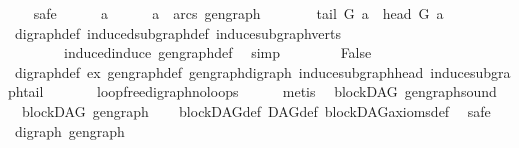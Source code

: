 \begin{isabellebody}
\ \ \isamarkupfalse%
\ safe\isanewline
\ \ \ \ \isamarkupfalse%
\ a\isanewline
\ \ \ \ \isamarkupfalse%
\ {\isachardoublequoteopen}a\ {\isasymin}\ arcs\ gen{\isacharunderscore}{\kern0pt}graph{\isachardoublequoteclose}\isanewline
\ \ \ \ \isamarkupfalse%
\ \isamarkupfalse%
\ {\isachardoublequoteopen}tail\ G\ a\ {\isacharequal}{\kern0pt}\ head\ G\ a{\isachardoublequoteclose}\isanewline
\ \ \ \ \ \ \isamarkupfalse%
\ digraph{\isacharunderscore}{\kern0pt}def\ induced{\isacharunderscore}{\kern0pt}subgraph{\isacharunderscore}{\kern0pt}def\ induce{\isacharunderscore}{\kern0pt}subgraph{\isacharunderscore}{\kern0pt}verts\isanewline
\ \ \ \ \ \ \ \ induced{\isacharunderscore}{\kern0pt}induce\ gen{\isacharunderscore}{\kern0pt}graph{\isacharunderscore}{\kern0pt}def\ \isamarkupfalse%
\ simp\isanewline
\ \ \isamarkupfalse%
\isanewline
\ \ \isamarkupfalse%
\ \isamarkupfalse%
\ False\isanewline
\ \ \ \ \isamarkupfalse%
\ digraph{\isacharunderscore}{\kern0pt}def\ ex\ gen{\isacharunderscore}{\kern0pt}graph{\isacharunderscore}{\kern0pt}def\ gen{\isacharunderscore}{\kern0pt}graph{\isacharunderscore}{\kern0pt}digraph\ induce{\isacharunderscore}{\kern0pt}subgraph{\isacharunderscore}{\kern0pt}head\ induce{\isacharunderscore}{\kern0pt}subgraph{\isacharunderscore}{\kern0pt}tail\ \isanewline
\ \ \ \ \ \ loopfree{\isacharunderscore}{\kern0pt}digraph{\isachardot}{\kern0pt}no{\isacharunderscore}{\kern0pt}loops\isanewline
\ \ \ \ \isamarkupfalse%
\ metis\isanewline
{}\isamarkupfalse%
%
\endisatagproof
{\isafoldproof}%
%
\isadelimproof
\isanewline
%
\endisadelimproof
\isanewline
\isanewline
{}\isamarkupfalse%
\ {\isacharparenleft}{\kern0pt}\ blockDAG{\isacharparenright}{\kern0pt}\ gen{\isacharunderscore}{\kern0pt}graph{\isacharunderscore}{\kern0pt}sound{\isacharcolon}{\kern0pt}\ \isanewline
\ \ {\isachardoublequoteopen}blockDAG\ {\isacharparenleft}{\kern0pt}gen{\isacharunderscore}{\kern0pt}graph{\isacharparenright}{\kern0pt}{\isachardoublequoteclose}\isanewline
%
\isadelimproof
\ \ %
\endisadelimproof
%
\isatagproof
{}\isamarkupfalse%
\ blockDAG{\isacharunderscore}{\kern0pt}def\ DAG{\isacharunderscore}{\kern0pt}def\ blockDAG{\isacharunderscore}{\kern0pt}axioms{\isacharunderscore}{\kern0pt}def\ \isanewline
{}\isamarkupfalse%
\ safe\isanewline
\ \ \isamarkupfalse%
\ {\isachardoublequoteopen}digraph\ gen{\isacharunderscore}{\kern0pt}graph{\isachardoublequoteclose}\ \isamarkupfalse%

\end{isabellebody}
